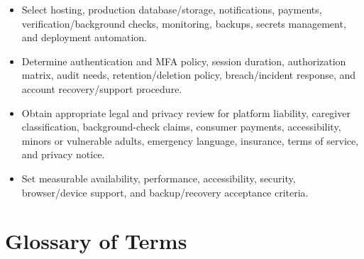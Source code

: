 \documentclass[11pt]{article}
\begin{document}
\begin{itemize}
  \item Select hosting, production database/storage, notifications, payments, verification/background checks, monitoring, backups, secrets management, and deployment automation.
  \item Determine authentication and MFA policy, session duration, authorization matrix, audit needs, retention/deletion policy, breach/incident response, and account recovery/support procedure.
  \item Obtain appropriate legal and privacy review for platform liability, caregiver classification, background-check claims, consumer payments, accessibility, minors or vulnerable adults, emergency language, insurance, terms of service, and privacy notice.
  \item Set measurable availability, performance, accessibility, security, browser/device support, and backup/recovery acceptance criteria.
\end{itemize}

\appendix
\section{Glossary of Terms}
\end{document}
